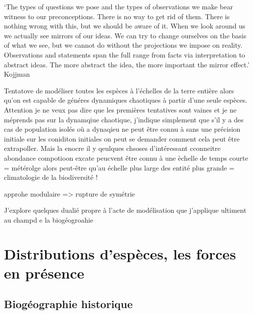`The types of questions we pose and the types of observations we make
bear witness to our preconceptions. There is no way to get rid of them.
There is nothing wrong with this, but we should be aware of it. When we
look around us we actually see mirrors of our ideas. We can try to
change ourselves on the basis of what we see, but we cannot do without
the projections we impose on reality. Observations and statements span
the full range from facts via interpretation to abstract ideas. The more
abstract the idea, the more important the mirror effect.' Kojjman

Tentatove de modéliser toutes les espèces à l'échelles de la terre
entière alors qu'on est capable de généres dynamiques chaotiques à
partir d'une seule espèces. Attention je ne veux pas dire que les
premières tentatives sont vaines et je ne méprends pas sur la dynamqiue
chaotique, j'indique simplement que s'il y a des cas de population
isolés où a dynaqieu ne peut être connu à sans une précision initiale
sur les coniditon initiales on peut se demander comment cela peut être
extrapoller. Mais la enocre il y qeulques chsoses d'intéressant
cconneitre abondance compotioon excate peucvent être connu à une èchelle
de temps courte = métérolge alors peut-être qu'au échelle plus large des
entité plus grande = climatologie de la biodiversité !

approhe modulaire =\textgreater{} rupture de symétrie

J'explore quelques dualié propre à l'acte de modélisation que j'applique
ultiment au champd e la biogéogroahie

\section*{Distributions d'espèces, les forces en
présence}\label{distributions-despuxe8ces-les-forces-en-pruxe9sence}

\subsection*{Biogéographie
historique}\label{bioguxe9ographie-historique}

